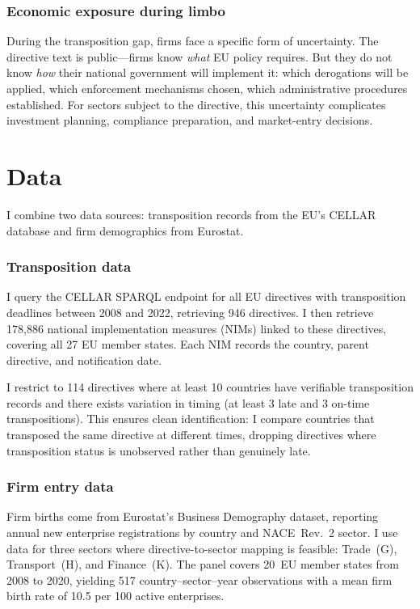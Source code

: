 \documentclass[12pt]{article}
\begin{document}
\subsubsection*{Economic exposure during limbo} During the transposition gap, firms face a specific form of uncertainty. The directive text is public---firms know \textit{what} EU policy requires. But they do not know \textit{how} their national government will implement it: which derogations will be applied, which enforcement mechanisms chosen, which administrative procedures established. For sectors subject to the directive, this uncertainty complicates investment planning, compliance preparation, and market-entry decisions.


\section{Data}
\label{sec:data}

I combine two data sources: transposition records from the EU's CELLAR database and firm demographics from Eurostat.

\subsubsection*{Transposition data} I query the CELLAR SPARQL endpoint for all EU directives with transposition deadlines between 2008 and 2022, retrieving 946 directives. I then retrieve 178,886 national implementation measures (NIMs) linked to these directives, covering all 27 EU member states. Each NIM records the country, parent directive, and notification date.

I restrict to 114 directives where at least 10 countries have verifiable transposition records and there exists variation in timing (at least 3 late and 3 on-time transpositions). This ensures clean identification: I compare countries that transposed the same directive at different times, dropping directives where transposition status is unobserved rather than genuinely late.

\subsubsection*{Firm entry data}
Firm births come from Eurostat's Business Demography dataset, reporting annual new enterprise registrations by country and NACE~Rev.~2 sector. I use data for three sectors where directive-to-sector mapping is feasible: Trade~(G), Transport~(H), and Finance~(K). The panel covers 20~EU member states from 2008 to 2020, yielding 517 country--sector--year observations with a mean firm birth rate of 10.5 per 100 active enterprises.
\end{document}
